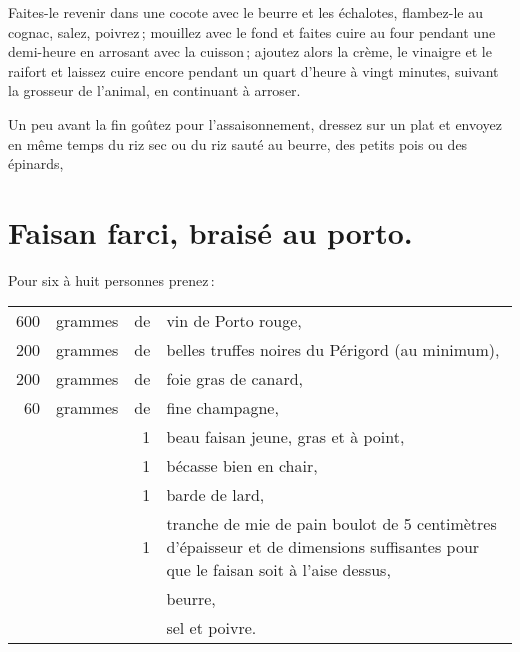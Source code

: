 Faites-le revenir dans une cocote avec le beurre et les échalotes, flambez-le
au cognac, salez, poivrez ; mouillez avec le fond et faites cuire au four
pendant une demi-heure en arrosant avec la cuisson ; ajoutez alors la crème, le
vinaigre et le raifort et laissez cuire encore pendant un quart d'heure à vingt
minutes, suivant la grosseur de l'animal, en continuant à arroser.

Un peu avant la fin goûtez pour l'assaisonnement, dressez sur un plat et
envoyez en même temps du riz sec ou du riz sauté au beurre, des petits pois ou
des épinards,

\section*{\centering Faisan farci, braisé au porto.}
{}
\label{pg0636} \hypertarget{p0636}{}

Pour six à huit personnes prenez :

\footnotesize
\begin{longtable}{rrrp{16em}}
    600 & grammes & de & vin de Porto rouge,                                                              \\
    200 & grammes & de & belles truffes noires du Périgord (au minimum),                                  \\
    200 & grammes & de & foie gras de canard,                                                             \\
     60 & grammes & de & fine champagne,                                                                  \\
        &         &  1 & beau faisan jeune, gras et à point,                                              \\
        &         &  1 & bécasse bien en chair,                                                           \\
        &         &  1 & barde de lard,                                                                   \\
        &         &  1 & tranche de mie de pain boulot de 5 centimètres
                         d'épaisseur et de dimensions suffisantes pour que
                         le faisan soit à l'aise dessus,                                                  \\
        &         &    & beurre,                                                                          \\
        &         &    & sel et poivre.                                                                   \\
\end{longtable}
\normalsize

